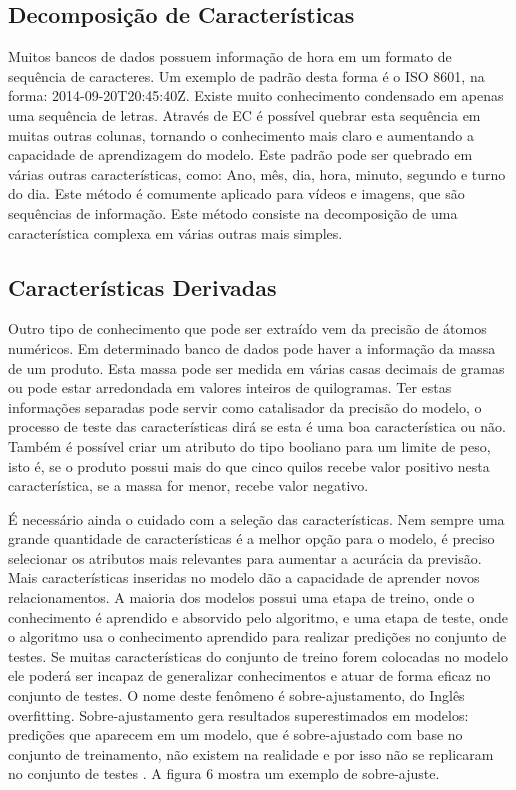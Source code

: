 \subsection{Decomposição de Características}
Muitos bancos de dados possuem informação de hora em um formato de sequência de caracteres. Um exemplo de padrão desta forma é o ISO 8601, na forma: 2014-09-20T20:45:40Z. Existe muito conhecimento condensado em apenas uma sequência de letras. Através de EC é possível quebrar esta sequência em muitas outras colunas, tornando o conhecimento mais claro e aumentando a capacidade de aprendizagem do modelo. Este padrão pode ser quebrado em várias outras características, como: Ano, mês, dia, hora, minuto, segundo e turno do dia. Este método é comumente aplicado para vídeos e imagens, que são sequências de informação. Este método consiste na decomposição de uma característica complexa em várias outras mais simples.


\subsection{Características Derivadas}
Outro tipo de conhecimento que pode ser extraído vem da precisão de átomos numéricos. Em determinado banco de dados pode haver a informação da massa de um produto. Esta massa pode ser medida em várias casas decimais de gramas ou pode estar arredondada em valores inteiros de quilogramas. Ter estas informações separadas pode servir como catalisador da precisão do modelo, o processo de teste das características dirá se esta é uma boa característica ou não. Também é possível criar um atributo do tipo booliano para um limite de peso, isto é, se o produto possui mais do que cinco quilos recebe valor positivo nesta característica, se a massa for menor, recebe valor negativo.

É necessário ainda o cuidado com a seleção das características. Nem sempre uma grande quantidade de características é a melhor opção para o modelo, é  preciso selecionar os atributos mais relevantes para aumentar a acurácia da previsão. Mais características inseridas no modelo dão a capacidade de aprender novos relacionamentos. A maioria dos modelos possui uma etapa de treino, onde o conhecimento é aprendido e absorvido pelo algoritmo, e uma etapa de teste, onde o algoritmo usa o conhecimento aprendido para realizar predições no conjunto de testes. Se muitas características do conjunto de treino forem colocadas no modelo ele poderá ser incapaz de generalizar conhecimentos e atuar de forma eficaz no conjunto de testes. O nome deste fenômeno é sobre-ajustamento, do Inglês overfitting. Sobre-ajustamento gera resultados superestimados em modelos: predições que aparecem em um modelo, que é sobre-ajustado com base no conjunto de treinamento, não existem na realidade e por isso não se replicaram no conjunto de testes \cite{what2013}. A figura 6  mostra um exemplo de sobre-ajuste.

